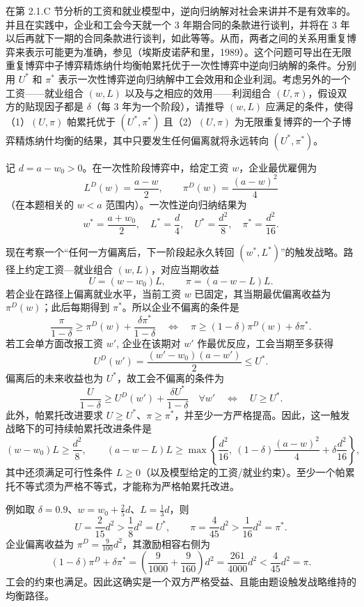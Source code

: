 在第 2.1.C 节分析的工资和就业模型中，逆向归纳解对社会来讲并不是有效率的。并且在实践中，企业和工会今天就一个 3 年期合同的条款进行谈判，并将在 3 年以后再就下一期的合同条款进行谈判，如此等等。从而，两者之间的关系用重复博弈来表示可能更为准确，参见（埃斯皮诺萨和里，1989）。这个问题可导出在无限重复博弈中子博弈精炼纳什均衡帕累托优于一次性博弈中逆向归纳解的条件。分别用 $U^*$ 和 $\pi^*$ 表示一次性博弈逆向归纳解中工会效用和企业利润。考虑另外的一个工资——就业组合 $(w,L)$ 以及与之相应的效用——利润组合 $(U,\pi)$，假设双方的贴现因子都是 $\delta$（每 3 年为一个阶段），请推导 $(w,L)$ 应满足的条件，使得（1）$(U,\pi)$ 帕累托优于 $(U^*,\pi^*)$ 且（2）$(U,\pi)$ 为无限重复博弈的一个子博弈精炼纳什均衡的结果，其中只要发生任何偏离就将永远转向 $(U^*,\pi^*)$。

\sol 记 $d=a-w_0>0$。在一次性阶段博弈中，给定工资 $w$，企业最优雇佣为
\[
  L^D(w)=\frac{a-w}{2},\qquad \pi^D(w)=\frac{(a-w)^2}{4}
\]\indent
（在本题相关的 $w<a$ 范围内）。一次性逆向归纳结果为
\[
  w^*=\frac{a+w_0}{2},\quad L^*=\frac{d}{4},\quad
  U^*=\frac{d^2}{8},\quad \pi^*=\frac{d^2}{16}.
\]

现在考察一个“任何一方偏离后，下一阶段起永久转回 $(w^*,L^*)$”的触发战略。路径上约定工资—就业组合 $(w,L)$，对应当期收益
\[
  U=(w-w_0)L,\qquad \pi=(a-w-L)L.
\]\indent
若企业在路径上偏离就业水平，当前工资 $w$ 已固定，其当期最优偏离收益为 $\pi^D(w)$；此后每期得到 $\pi^*$。所以企业不偏离的条件是
\[
  \frac{\pi}{1-\delta}\ge \pi^D(w)+\frac{\delta\pi^*}{1-\delta}
  \quad\Longleftrightarrow\quad
  \pi\ge (1-\delta)\pi^D(w)+\delta\pi^*.
  \tag{1}
\]\indent
若工会单方面改报工资 $w'$, 企业在该期对 $w'$ 作最优反应，工会当期至多获得
\[
  U^D(w')=\frac{(w'-w_0)(a-w')}{2}\le U^*.
\]\indent
偏离后的未来收益也为 $U^*$，故工会不偏离的条件为
\[
  \frac{U}{1-\delta}\ge U^D(w')+\frac{\delta U^*}{1-\delta}\quad\forall w'
  \quad\Longleftrightarrow\quad U\ge U^*.
  \tag{2}
\]\indent
此外，帕累托改进要求 $U\ge U^*$、$\pi\ge\pi^*$，并至少一方严格提高。因此，这一触发战略下的可持续帕累托改进条件是
\[
  \boxed{
  (w-w_0)L\ge\frac{d^2}{8},\qquad
  (a-w-L)L\ge
  \max\!\left\{\frac{d^2}{16},\ (1-\delta)\frac{(a-w)^2}{4}+\delta\frac{d^2}{16}\right\},
  }
  \tag{3}
\]\indent
其中还须满足可行性条件 $L\ge0$（以及模型给定的工资/就业约束）。至少一个帕累托不等式须为严格不等式，才能称为严格帕累托改进。

例如取 $\delta=0.9$、$w=w_0+\frac25d$、$L=\frac13d$，则
\[
  U=\frac{2}{15}d^2>\frac18d^2=U^*,\qquad
  \pi=\frac{4}{45}d^2>\frac1{16}d^2=\pi^*.
\]\indent
企业偏离收益为 $\pi^D=\frac{9}{100}d^2$，其激励相容右侧为
\[
  (1-\delta)\pi^D+\delta\pi^*
  =\left(\frac9{1000}+\frac9{160}\right)d^2
  =\frac{261}{4000}d^2<\frac4{45}d^2=\pi.
\]\indent
工会的约束也满足。因此这确实是一个双方严格受益、且能由题设触发战略维持的均衡路径。


